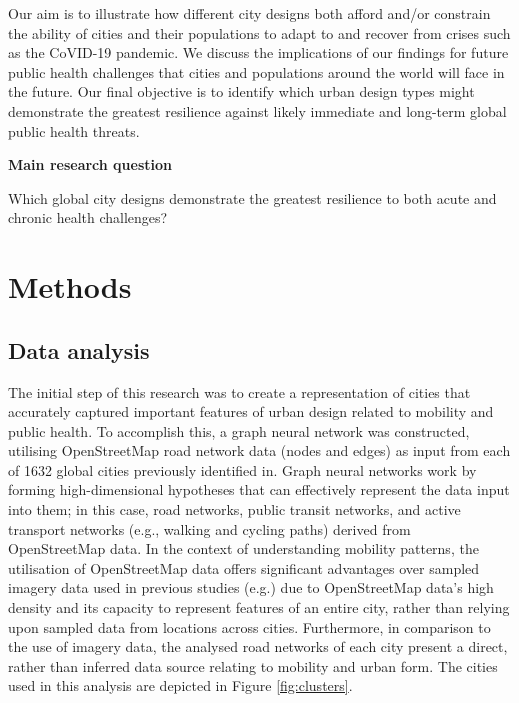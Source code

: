 \documentclass[preprint,12pt]{elsarticle}
\begin{document}
Our aim is to illustrate how different city designs both afford and/or constrain the ability of cities and their populations to adapt to and recover from crises such as the CoVID-19 pandemic. We discuss the implications of our findings for future public health challenges that cities and populations around the world will face in the future. Our final objective is to identify which urban design types might demonstrate the greatest resilience against likely immediate and long-term global public health threats. 


\textbf{Main research question}

 Which global city designs demonstrate the greatest resilience to both acute and chronic health challenges?








\section*{Methods}



\subsection*{Data analysis}
The initial step of this research was to create a representation of cities that accurately captured important features of urban design related to mobility and public health. To accomplish this, a graph neural network was constructed, utilising OpenStreetMap road network data\cite{Boeing2017a} (nodes and edges) as input from each of 1632 global cities previously identified in\cite{Thompson2020}. Graph neural networks work by forming high-dimensional hypotheses that can effectively represent the data input into them; in this case, road networks, public transit networks, and active transport networks (e.g., walking and cycling paths) derived from OpenStreetMap data. In the context of understanding mobility patterns, the utilisation of OpenStreetMap data offers significant advantages over sampled imagery data used in previous studies (e.g.\cite{Thompson2020,seneviratne2021self}) due to OpenStreetMap data's high density and its capacity to represent features of an entire city, rather than relying upon sampled data from locations across cities. Furthermore, in comparison to the use of imagery data, the analysed road networks of each city present a direct, rather than inferred data source relating to mobility and urban form. The cities used in this analysis are depicted in Figure \ref{fig:clusters}.
\end{document}
